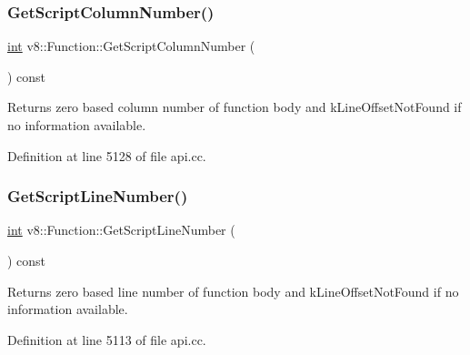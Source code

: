 \subsubsection{\texorpdfstring{Get\+Script\+Column\+Number()}{GetScriptColumnNumber()}}
{\footnotesize\ttfamily \mbox{\hyperlink{classint}{int}} v8\+::\+Function\+::\+Get\+Script\+Column\+Number (\begin{DoxyParamCaption}{ }\end{DoxyParamCaption}) const}

Returns zero based column number of function body and k\+Line\+Offset\+Not\+Found if no information available. 

Definition at line 5128 of file api.\+cc.

\mbox{\label{classv8_1_1Function_a616f966e538ec32182acd4acb7ee70bc}} 
\subsubsection{\texorpdfstring{Get\+Script\+Line\+Number()}{GetScriptLineNumber()}}
{\footnotesize\ttfamily \mbox{\hyperlink{classint}{int}} v8\+::\+Function\+::\+Get\+Script\+Line\+Number (\begin{DoxyParamCaption}{ }\end{DoxyParamCaption}) const}

Returns zero based line number of function body and k\+Line\+Offset\+Not\+Found if no information available. 

Definition at line 5113 of file api.\+cc.

\mbox{\label{classv8_1_1Function_a6b5dd53724b97fd2c7da9ea9a772367d}} 
